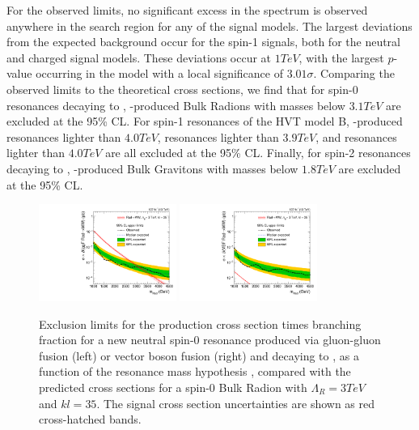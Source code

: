 For the observed limits, no significant excess in the \MX spectrum is observed anywhere in the search region for any of the signal models.
The largest deviations from the expected background occur for the \VBF spin-1 signals, both for the neutral and charged signal models.
These deviations occur at $1\unit{TeV}$, with the largest $p$-value occurring in the \VBF\WprtoWZ model with a local significance of $3.01\sigma$.
Comparing the observed limits to the theoretical cross sections, we find that for spin-0 resonances decaying to \WW, \ggF-produced Bulk Radions with masses below $3.1\unit{TeV}$ are excluded at the 95\% CL.
For spin-1 resonances of the HVT model B, \DY-produced \ZprtoWW resonances lighter than $4.0\unit{TeV}$, \WprtoWZ resonances lighter than $3.9\unit{TeV}$, and \WprtoWH resonances lighter than $4.0\unit{TeV}$ are all excluded at the 95\% CL.
Finally, for spin-2 resonances decaying to \WW, \ggF-produced Bulk Gravitons with masses below $1.8\unit{TeV}$ are excluded at the 95\% CL.

\begin{figure}[htbp]
  \centering
  \includegraphics[width=0.4\textwidth]{fig/results/limits_RadToWW.pdf}
  \includegraphics[width=0.4\textwidth]{fig/results/limits_VBFRadToWW.pdf}
  \caption{
    Exclusion limits for the production cross section times branching fraction for a new neutral spin-0 resonance produced via gluon-gluon fusion (left) or vector boson fusion (right) and decaying to \WW, as a function of the resonance mass hypothesis \MX, compared with the predicted cross sections for a spin-0 Bulk Radion with $\Lambda_{R}=3\unit{TeV}$ and $kl=35$.
    The signal cross section uncertainties are shown as red cross-hatched bands.
  }
  \label{fig:limits_spin0}
\end{figure}

